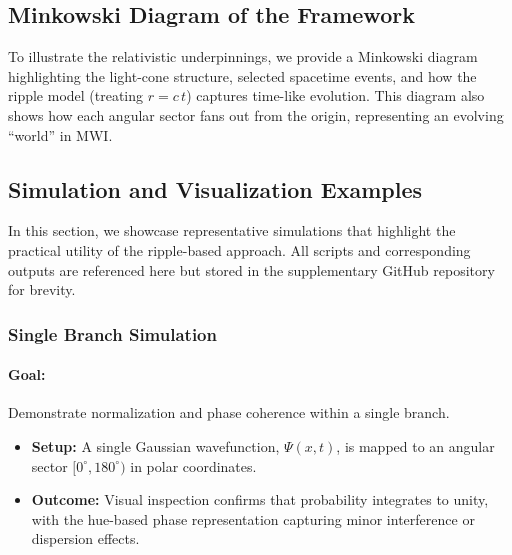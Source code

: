 \documentclass{article}
\begin{document}
\subsection{Minkowski Diagram of the Framework}
To illustrate the relativistic underpinnings, we provide a Minkowski diagram highlighting the light-cone structure, selected spacetime events, and how the ripple model (treating \(r = c\,t\)) captures time-like evolution. This diagram also shows how each angular sector fans out from the origin, representing an evolving “world” in MWI.


\subsection{Simulation and Visualization Examples}

In this section, we showcase representative simulations that highlight the practical utility of the ripple-based approach. All scripts and corresponding outputs are referenced here but stored in the supplementary GitHub repository for brevity.

\subsubsection{Single Branch Simulation}
\paragraph{Goal:} Demonstrate normalization and phase coherence within a single branch.
\begin{itemize}
    \item \textbf{Setup:} A single Gaussian wavefunction, \(\Psi(x,t)\), is mapped to an angular sector \([0^\circ,180^\circ)\) in polar coordinates.
    \item \textbf{Outcome:} Visual inspection confirms that probability integrates to unity, with the hue-based phase representation capturing minor interference or dispersion effects.
\end{itemize}
\end{document}
